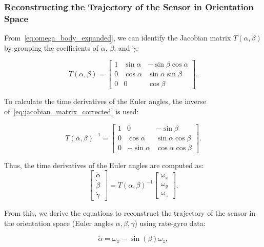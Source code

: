 \documentclass[12pt]{article}
\begin{document}
\subsubsection{Reconstructing the Trajectory of the Sensor in Orientation Space}

From~\ref{eq:omega_body_expanded}, we can identify the Jacobian matrix \(T(\alpha, \beta)\) by grouping the coefficients of \(\dot{\alpha}\), \(\dot{\beta}\), and \(\dot{\gamma}\):

\begin{equation}
\label{eq:jacobian_matrix_corrected}
T(\alpha, \beta) =
\begin{bmatrix}
1 & \sin\alpha & -\sin\beta \cos\alpha \\
0 & \cos\alpha & \sin\alpha \sin\beta \\
0 & 0 & \cos\beta
\end{bmatrix}.
\end{equation}

To calculate the time derivatives of the Euler angles, the inverse of~\ref{eq:jacobian_matrix_corrected} is used:

\begin{equation}
\label{eq:jacobian_inverse}
T(\alpha, \beta)^{-1} =
\begin{bmatrix}
1 & 0 & -\sin\beta \\
0 & \cos\alpha & \sin\alpha \cos\beta \\
0 & -\sin\alpha & \cos\alpha \cos\beta
\end{bmatrix}.
\end{equation}

Thus, the time derivatives of the Euler angles are computed as:
\begin{equation}
\label{eq:euler_derivatives}
\begin{bmatrix}
\dot{\alpha} \\
\dot{\beta} \\
\dot{\gamma}
\end{bmatrix}
=
T(\alpha, \beta)^{-1}
\begin{bmatrix}
\omega_x \\
\omega_y \\
\omega_z
\end{bmatrix}.
\end{equation}

From this, we derive the equations to reconstruct the trajectory of the sensor in the orientation space (Euler angles \(\alpha, \beta, \gamma\)) using rate-gyro data:

\begin{equation}
\label{eq:alpha_corrected}
\dot{\alpha} = \omega_x - \sin(\beta) \omega_z ,
\end{equation}
\end{document}
